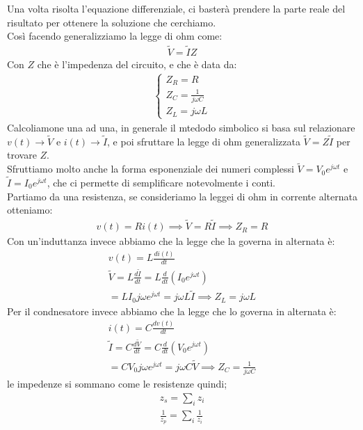 \documentclass[a4paper, oneside]{article}
\begin{document}
Una volta risolta l'equazione differenziale, ci basterà prendere la parte reale del risultato per ottenere la soluzione che cerchiamo.\\
Così facendo generalizziamo la legge di ohm come:
\begin{gather*}
    \tilde{V} = \tilde{I} Z
\end{gather*}
Con $Z$ che è l'impedenza del circuito, e che è data da:
\begin{gather*}
    \begin{cases}
        Z_R = R\\
        Z_C = \frac{1}{j \omega C}\\
        Z_L = j \omega L
    \end{cases}
\end{gather*}
Calcoliamone una ad una, in generale il mtedodo simbolico si basa sul relazionare $v(t) \to \tilde{V}$ e $i(t) \to \tilde{I}$, e poi sfruttare la legge di ohm generalizzata $\tilde{V} = Z \tilde{I}$ per trovare $Z$.\\
Sfruttiamo molto anche la forma esponenziale dei numeri complessi $\tilde{V} = V_0 e^{j \omega t}$ e $\tilde{I} = I_0 e^{j \omega t}$, che ci permette di semplificare notevolmente i conti.\\
Partiamo da una resistenza, se consideriamo la leggei di ohm in corrente alternata otteniamo:
\begin{gather*}
    v(t) = R i(t) \implies \tilde{V} = R \tilde{I} \implies Z_R = R
\end{gather*}
Con un'induttanza invece abbiamo che la legge che la governa in alternata è:
\begin{gather*}
    v(t) = L \frac{di(t)}{dt} \\
    \tilde{V} = L \frac{d\tilde{I}}{dt} = L \frac{d}{dt} (I_0 e^{j \omega t})\\
    = L I_0 j \omega e^{j \omega t} = j \omega L \tilde{I} \implies Z_L = j \omega L
\end{gather*}
Per il condnesatore invece abbiamo che la legge che lo governa in alternata è:
\begin{gather*}
    i(t) = C \frac{dv(t)}{dt} \\
    \tilde{I} = C \frac{d\tilde{V}}{dt} = C \frac{d}{dt} (V_0 e^{j \omega t})\\
    = C V_0 j \omega e^{j \omega t} = j \omega C \tilde{V} \implies Z_C = \frac{1}{j \omega C}
\end{gather*}
le impedenze si sommano come le resistenze quindi;
\begin{gather*}
    z_s = \sum_i z_i\\
    \frac{1}{z_p} = \sum_i \frac{1}{z_i}
\end{gather*}
\end{document}
